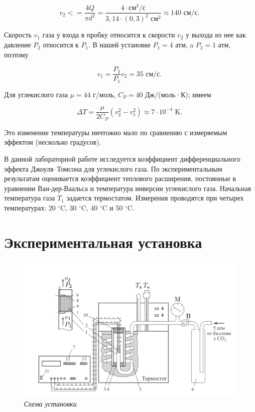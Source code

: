 \documentclass[a4paper, 12pt]{article}
\begin{document}
$$ v_2<=\frac{4Q}{\pi d^2} = \frac{4\cdot\text{см}^3/\text{с}}{3,14\cdot(0,3)^2\text{ см}^2} \approx 140 \text{ см}/\text{с}. $$

Скорость $ v_1 $ газа у входа в пробку относится к скорости $ v_2 $ у выхода из нее как давление $ P_2 $ относится к $ P_1 $. В нашей установке $ P_1 = 4 $ атм, a $ P_2 = 1 $ атм, поэтому

$$ v_1=\frac{P_2}{P_1}v_2 = 35 \text{ см}/\text{с}. $$

Для углекислого газа $ \mu = 44 $ г/моль, $ C_P = 40 $ Дж/(моль·К); имеем

$$ \Delta T = \frac{\mu}{2C_P}\left(v_2^2-v_1^2\right) \approx 7\cdot10^{-4} \text{ K}. $$

Это изменение температуры ничтожно мало по сравнению с измеряемым эффектом (несколько градусов).

В данной лабораторной работе исследуется коэффициент дифференциального эффекта Джоуля–Томсона для углекислого газа. По экспериментальным результатам оценивается коэффициент теплового расширения, постоянные в уравнении Ван-дер-Ваальса и температура инверсии углекислого газа. Начальная температура газа $ T_1 $ задается термостатом. Измерения проводятся при четырех температурах: 20 $ ^\circ $C, 30 $ ^\circ $C, 40 $ ^\circ $C и 50 $ ^\circ $C.

\section*{Экспериментальная установка}

\begin{figure}[H]
	\begin{center}
		\includegraphics[width=18cm]{scheme.png}
	\end{center}
	\caption{\textit{Схема установки}}
	\label{scheme}
\end{figure}
\end{document}
